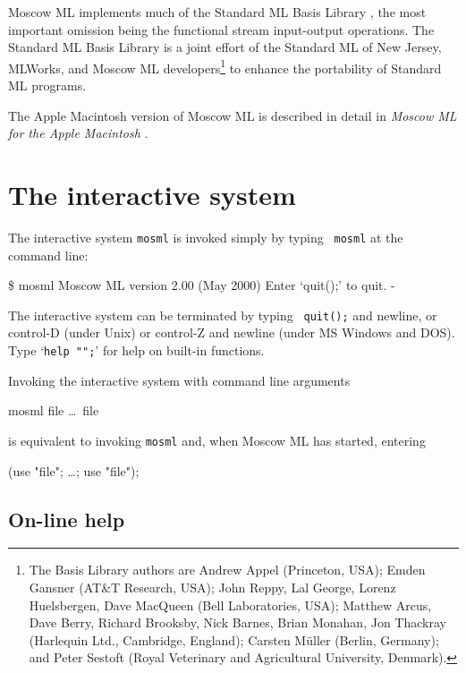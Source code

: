 \documentclass[fleqn]{article}
\begin{document}
Moscow ML implements much of the Standard ML Basis Library
\cite{SMLBasis:1996:StandardML}, the most important omission being the
functional stream input-output operations.  The Standard ML Basis
Library is a joint effort of the Standard ML of New Jersey, MLWorks,
and Moscow ML developers\footnote{The Basis Library authors are Andrew
  Appel (Princeton, USA); Emden Gansner (AT\&T Research, USA); John
  Reppy, Lal George, Lorenz Huelsbergen, Dave MacQueen (Bell
  Laboratories, USA); Matthew Arcus, Dave Berry, Richard Brooksby,
  Nick Barnes, Brian Monahan, Jon Thackray (Harlequin Ltd., Cambridge,
  England); Carsten M{\"u}ller (Berlin, Germany); and Peter Sestoft
  (Royal Veterinary and Agricultural University, Denmark).} to enhance
the portability of Standard ML programs.

The Apple Macintosh version of Moscow ML is described in detail in
\emph{Moscow ML for the Apple Macintosh}
\cite{Currie:1999:MoscowMLMac}.


\section{The interactive system}
\label{sec-interactive-system}

The interactive system {\tt mosml} is invoked simply by typing {\tt
  mosml} at the command line:

\begin{program}
\$ mosml
Moscow ML version 2.00 (May 2000)
Enter `quit();' to quit.
- 
\end{program}

\noindent The interactive system can be terminated by typing {\tt
  quit();} and newline, or control-D (under Unix) or control-Z and
newline (under MS Windows and DOS).  Type `{\tt help "";}' for help on
built-in functions.

Invoking the interactive system with command line arguments

\begin{program}
mosml file \ldots\ file
\end{program}

\noindent is equivalent to invoking {\tt mosml} and, when Moscow ML
has started, entering

\begin{program}
(use "file"; \ldots; use "file");  
\end{program}


\subsection{On-line help}
\label{sec-mosml-help}
\end{document}
